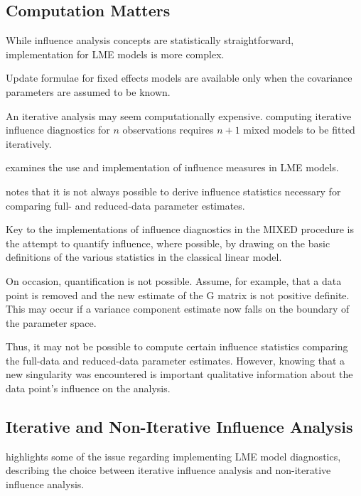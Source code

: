 \documentclass[12pt, a4paper]{report}
\theoremstyle{plain}
\theoremstyle{definition}
\theoremstyle{remark}
\begin{document}


	\subsection{Computation Matters}
	While influence analysis concepts are statistically straightforward, implementation for LME models is more complex.
	
	Update formulae for fixed effects models are available only when the covariance parameters are assumed to be known.
	
	
	An iterative analysis may seem computationally expensive. computing iterative influence diagnostics for $n$ observations
	requires $n+1$ mixed models to be fitted iteratively.
	

	\citet{schabenberger} examines the use and implementation of
	influence measures in LME models.
	
	\citet{schabenberger} notes that it is not always possible to
	derive influence statistics necessary for comparing full- and
	reduced-data parameter estimates.
		
Key to the implementations of influence diagnostics in the MIXED procedure is the attempt to quantify
influence, where possible, by drawing on the basic definitions of the various statistics in the classical linear
model. 

On occasion, quantification is not possible. Assume, for example, that a data point is removed
and the new estimate of the G matrix is not positive definite. This may occur if a variance component
estimate now falls on the boundary of the parameter space. 

Thus, it may not be possible to compute certain
influence statistics comparing the full-data and reduced-data parameter estimates. However, knowing that
a new singularity was encountered is important qualitative information about the data point’s influence on
the analysis.
	
	
\subsection{Iterative and Non-Iterative Influence Analysis}
\citet{schabenberger} highlights some of the issue regarding implementing LME model diagnostics, describing  the choice between  iterative influence analysis and  non-iterative influence analysis.
\end{document}
